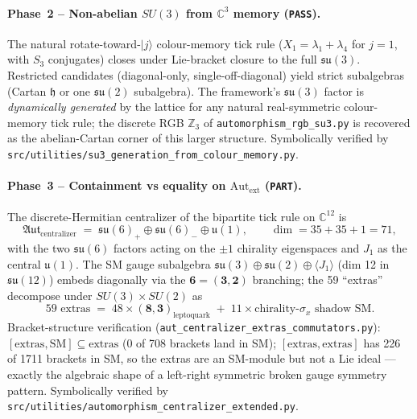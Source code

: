 \paragraph{Phase~2 -- Non-abelian $SU(3)$ from $\mathbb{C}^3$ memory (\texttt{PASS}).}
The natural rotate-toward-$|j\rangle$ colour-memory tick rule
($X_1 = \lambda_1 + \lambda_4$ for $j = 1$, with $S_3$ conjugates)
closes under Lie-bracket closure to the full $\mathfrak{su}(3)$.
Restricted candidates (diagonal-only, single-off-diagonal) yield
strict subalgebras (Cartan $\mathfrak{h}$ or one $\mathfrak{su}(2)$
subalgebra).  The framework's $\mathfrak{su}(3)$ factor is
\emph{dynamically generated} by the lattice for any natural
real-symmetric colour-memory tick rule; the discrete RGB
$\mathbb{Z}_3$ of \nolinkurl{automorphism_rgb_su3.py} is recovered as
the abelian-Cartan corner of this larger structure.  Symbolically
verified by \nolinkurl{src/utilities/su3_generation_from_colour_memory.py}.

\paragraph{Phase~3 -- Containment vs equality on $\mathrm{Aut}_\text{ext}$ (\texttt{PART}).}
The discrete-Hermitian centralizer of the bipartite tick rule on
$\mathbb{C}^{12}$ is
\begin{equation}
\label{eq:su6_su6_u1}
\mathfrak{Aut}_{\text{centralizer}} \;=\; \mathfrak{su}(6)_+ \oplus \mathfrak{su}(6)_- \oplus \mathfrak{u}(1),
\qquad \dim = 35 + 35 + 1 = 71,
\end{equation}
with the two $\mathfrak{su}(6)$ factors acting on the $\pm 1$
chirality eigenspaces and $J_1$ as the central $\mathfrak{u}(1)$.
The SM gauge subalgebra $\mathfrak{su}(3) \oplus \mathfrak{su}(2)
\oplus \langle J_1 \rangle$ (dim 12 in $\mathfrak{su}(12)$) embeds
diagonally via the $\mathbf{6} = (\mathbf{3}, \mathbf{2})$
branching; the 59 ``extras'' decompose under $SU(3) \times SU(2)$
as
\begin{equation}
\label{eq:extras_decomp}
\text{59 extras} \;=\; 48 \times (\mathbf{8}, \mathbf{3})_{\text{leptoquark}}
\;+\; 11 \times \text{chirality-}\sigma_x\text{ shadow SM}.
\end{equation}
Bracket-structure verification
(\nolinkurl{aut_centralizer_extras_commutators.py}):
$[\text{extras}, \text{SM}] \subseteq \text{extras}$ (0 of 708
brackets land in SM); $[\text{extras}, \text{extras}]$ has 226 of
1711 brackets in SM, so the extras are an SM-module but not a Lie
ideal --- exactly the algebraic shape of a left-right symmetric
broken gauge symmetry pattern.  Symbolically verified by
\nolinkurl{src/utilities/automorphism_centralizer_extended.py}.

